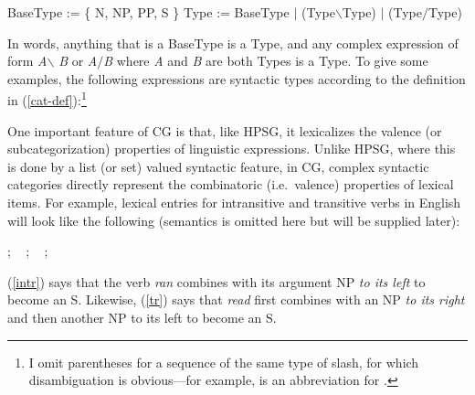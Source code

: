 \documentclass[output=paper
                ,modfonts
                ,nonflat
	        ,collection
	        ,collectionchapter
	        ,collectiontoclongg
 	        ,biblatex
                ,babelshorthands
                ,newtxmath
                ,draftmode
                ,colorlinks, citecolor=brown
]{./langsci/langscibook}
\begin{document}
\begin{exe}
 \ex\label{cat-def}
  \begin{xlist}
 \ex\label{bascat}
    BaseType := \{ N,  NP, PP, S \}
 \ex\label{complex-cat}
    Type := BaseType $|$ (Type\ensuremath{\backslash}Type) $|$ (Type\ensuremath{/}Type)
  \end{xlist}
\end{exe}
In words, anything that is a BaseType is a Type, and
any complex expression of form
\textit{A}\ensuremath{\backslash} \textit{B}  or
\textit{A}\ensuremath{/}\textit{B} where \textit{A} and \textit{B} are both
Types is a Type. To give some examples, the following expressions are
syntactic types according to the definition in
(\ref{cat-def}):\footnote{I omit
parentheses for a sequence of the same type of slash, for which
disambiguation is obvious---for example,  is an abbreviation for .}

\begin{exe}
 \ex
  \begin{xlist}
 \ex
 \ex
 \ex
 \ex
  \end{xlist}
\end{exe}

One important feature of CG is that, like HPSG, it lexicalizes the
valence (or subcategorization) properties of linguistic expressions.
Unlike HPSG, where this is done by a list (or set) valued syntactic
feature, in CG, complex syntactic categories directly represent the
combinatoric (i.e.~valence) properties of lexical items. For example,
lexical entries for intransitive and transitive verbs in English will
look like the following (semantics is omitted here but will be
supplied later):

\begin{exe}
 \ex\label{lex1}
  \begin{xlist}
 \ex\label{intr}
    ; \  
 \ex\label{tr}
    ; \ 
 \ex\label{trthree}
    ; \ 
  \end{xlist}
\end{exe}
(\ref{intr}) says that the verb \textit{ran} combines with its argument NP \emph{to its
left} to become an S. Likewise, (\ref{tr}) says that \textit{read} first
combines with an NP \emph{to its right} and then another NP to its left to
become an S.
\end{document}
